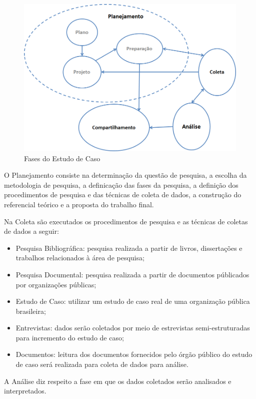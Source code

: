 	\begin{figure}[htb]
		\centering
		\label{fig01}
			\includegraphics[scale=0.6]{figuras/fasesestudo.png}
		\caption{Fases do Estudo de Caso}
	\end{figure}

O Planejamento consiste na determinação da questão de pesquisa, a escolha da metodologia de pesquisa, a definicação das fases da pesquisa,  a definição dos procedimentos de pesquisa e das técnicas de coleta de dados, a construção do referencial teórico e a proposta do trabalho final.


Na Coleta são executados os procedimentos de pesquisa e as técnicas de coletas de dados a seguir:

\begin{itemize}
\item Pesquisa Bibliográfica: pesquisa realizada a partir de livros, dissertações e trabalhos relacionados à área de pesquisa;
\item Pesquisa Documental: pesquisa realizada a partir de documentos públicados por organizações públicas;
\item Estudo de Caso: utilizar um estudo de caso real de uma organização pública brasileira;
\item Entrevistas: dados serão coletados por meio de estrevistas semi-estruturadas para incremento do estudo de caso;
\item Documentos: leitura dos documentos fornecidos pelo órgão público do estudo de caso será realizada para coleta de dados para análise.
\end{itemize}

A Análise diz respeito a fase em que os dados coletados serão analisados e interpretados.

